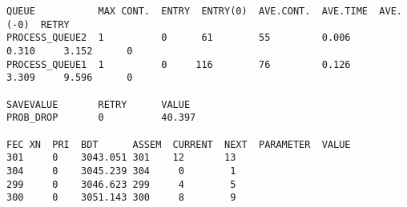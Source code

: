 \begin{lstlisting}[label=data50,caption=Результат работы программы для увеличенного времени работы первого оператора]
QUEUE           MAX CONT.  ENTRY  ENTRY(0)  AVE.CONT.  AVE.TIME  AVE.(-0)  RETRY
PROCESS_QUEUE2  1          0      61        55         0.006      0.310     3.152      0
PROCESS_QUEUE1  1          0     116        76         0.126      3.309     9.596      0

SAVEVALUE       RETRY      VALUE
PROB_DROP       0          40.397

FEC XN  PRI  BDT      ASSEM  CURRENT  NEXT  PARAMETER  VALUE
301     0    3043.051 301    12       13
304     0    3045.239 304     0        1
299     0    3046.623 299     4        5
300     0    3051.143 300     8        9
\end{lstlisting}
